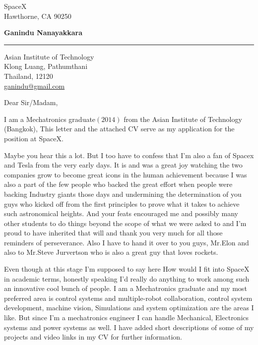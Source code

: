 \documentclass{letter} %
\begin{document}
\signature{Ganindu Nanayakkara}           %
\longindentation=0pt                       %
\let\raggedleft\raggedright                %
 
 
\begin{letter}{%
SpaceX \\  Hawthorne, CA 90250
}

\begin{center}
{\large\bf Ganindu Nanayakkara} 
\end{center}
\medskip\hrule height 1pt
\begin{center}
{Asian Institute of Technology \\   Klong Luang, Pathumthani\\ Thailand, 12120
\\ \url{ganindu@gmail.com}} \end{center} \vfill %


\opening{Dear Sir/Madam,} 
 
\noindent
I am a Mechatronics graduate$(2014)$ from the Asian Institute of Technology
(Bangkok), This letter and the attached CV serve as my application for the
position at SpaceX. 

\noindent
Maybe you hear this a lot. But I too have to confess that I'm also a fan of
Spacex and Tesla from the very early days. It is and was a great joy watching
the two companies grow to become great icons in the human achievement because I
was also a part of the few people who backed the great effort when people were
backing Industry giants those days and undermining the determination of you
guys who kicked off from the first principles to prove what it takes to achieve
such astronomical heights. And your feats encouraged me and possibly many other
students to do things beyond the scope of what we were asked to and I'm proud
to have inherited that will and thank you very much for all those reminders of
perseverance. Also I have to hand it over to you guys, Mr.Elon and also to
Mr.Steve Jurvertson who is also a great guy that loves rockets.

\noindent
Even though at this stage I'm supposed to say here How would I fit into SpaceX
in academic terms, honestly speaking I'd really do anything to work among such an innovative
cool bunch of people. I am a Mechatronics graduate and my most preferred area is
control systems and multiple-robot collaboration, control system development,
machine vision, Simulations and system optimization are the areas I like. But since I'm
a mechatronics engineer I can handle Mechanical, Electronics systems and power
systems as well. I have added short descriptions of some of my projects and
video links in my CV for further information. 


\end{letter}
\end{document}
